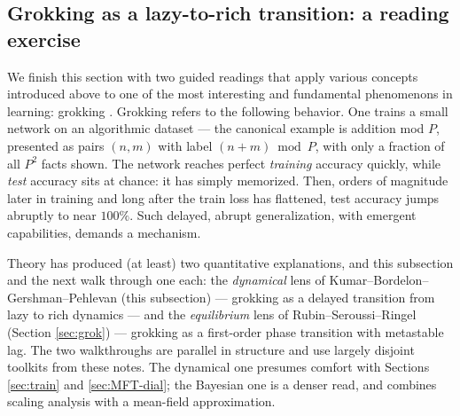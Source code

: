 \documentclass[11pt]{article}
\begin{document}


\subsection{Grokking as a lazy-to-rich transition: a reading exercise}
\label{sec:grok-lazy}

We finish this section with two guided readings that apply various concepts introduced above to one of the most interesting and fundamental phenomenons in learning: grokking \cite{power2022grokking}. Grokking refers to the following behavior.  One trains a small network on an algorithmic dataset --- the canonical example is addition mod $P$, presented as pairs $(n,m)$ with label $(n+m)\bmod P$, with only a fraction of all $P^2$ facts shown. The network reaches perfect \emph{training} accuracy quickly, while \emph{test} accuracy sits at chance: it has simply memorized. Then, orders of magnitude later in training and long after the train loss has flattened, test accuracy jumps abruptly to near $100\%$. Such delayed, abrupt generalization, with emergent capabilities, demands a mechanism.

Theory has produced (at least) two quantitative explanations, and this subsection and the next walk through one each: the \emph{dynamical} lens of Kumar--Bordelon--Gershman--Pehlevan \cite{kumar2024grokking} (this subsection) --- grokking as a delayed transition from lazy to rich dynamics --- and the \emph{equilibrium} lens of Rubin--Seroussi--Ringel \cite{rubin2024grokking} (Section \ref{sec:grok}) --- grokking as a first-order phase transition with metastable lag. The two walkthroughs are parallel in structure and use largely disjoint toolkits from these notes. The dynamical one presumes comfort with Sections \ref{sec:train} and \ref{sec:MFT-dial}; the Bayesian one is a denser read, and combines scaling analysis with a mean-field approximation. 
\end{document}

